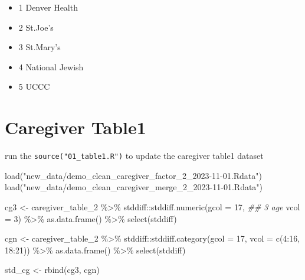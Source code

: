 \documentclass[
  letterpaper,
  DIV=11,
  numbers=noendperiod]{scrreprt}
\newenvironment{Shaded}{\begin{snugshade}}{\end{snugshade}}
\newcommand{\AttributeTok}[1]{\textcolor[rgb]{0.40,0.45,0.13}{#1}}
\newcommand{\DecValTok}[1]{\textcolor[rgb]{0.68,0.00,0.00}{#1}}
\newcommand{\DocumentationTok}[1]{\textcolor[rgb]{0.37,0.37,0.37}{\textit{#1}}}
\newcommand{\FunctionTok}[1]{\textcolor[rgb]{0.28,0.35,0.67}{#1}}
\newcommand{\NormalTok}[1]{\textcolor[rgb]{0.00,0.23,0.31}{#1}}
\newcommand{\OtherTok}[1]{\textcolor[rgb]{0.00,0.23,0.31}{#1}}
\newcommand{\SpecialCharTok}[1]{\textcolor[rgb]{0.37,0.37,0.37}{#1}}
\newcommand{\StringTok}[1]{\textcolor[rgb]{0.13,0.47,0.30}{#1}}
\providecommand{\tightlist}{%
  \setlength{\itemsep}{0pt}\setlength{\parskip}{0pt}}\usepackage{longtable,booktabs,array}
\begin{document}
\begin{itemize}
\tightlist
\item
  1 Denver Health
\item
  2 St.Joe's
\item
  3 St.Mary's
\item
  4 National Jewish
\item
  5 UCCC
\end{itemize}


\hypertarget{caregiver-table1}{%
\chapter{Caregiver Table1}\label{caregiver-table1}}

run the \texttt{source("01\_table1.R")} to update the caregiver table1
dataset

\begin{Shaded}
\begin{Highlighting}[]
\FunctionTok{load}\NormalTok{(}\StringTok{"new\_data/demo\_clean\_caregiver\_factor\_2\_2023{-}11{-}01.Rdata"}\NormalTok{)}
\FunctionTok{load}\NormalTok{(}\StringTok{"new\_data/demo\_clean\_caregiver\_merge\_2\_2023{-}11{-}01.Rdata"}\NormalTok{)}

\NormalTok{cg3 }\OtherTok{\textless{}{-}}\NormalTok{ caregiver\_table\_2 }\SpecialCharTok{\%\textgreater{}\%} 
\NormalTok{  stddiff}\SpecialCharTok{::}\FunctionTok{stddiff.numeric}\NormalTok{(}\AttributeTok{gcol =} \DecValTok{17}\NormalTok{, }
                           \DocumentationTok{\#\# 3 age}
                           \AttributeTok{vcol =} \DecValTok{3}\NormalTok{) }\SpecialCharTok{\%\textgreater{}\%}
  \FunctionTok{as.data.frame}\NormalTok{() }\SpecialCharTok{\%\textgreater{}\%}
  \FunctionTok{select}\NormalTok{(stddiff)}

\NormalTok{cgn }\OtherTok{\textless{}{-}}\NormalTok{ caregiver\_table\_2 }\SpecialCharTok{\%\textgreater{}\%} 
\NormalTok{  stddiff}\SpecialCharTok{::}\FunctionTok{stddiff.category}\NormalTok{(}\AttributeTok{gcol =} \DecValTok{17}\NormalTok{, }
                           \AttributeTok{vcol =} \FunctionTok{c}\NormalTok{(}\DecValTok{4}\SpecialCharTok{:}\DecValTok{16}\NormalTok{, }\DecValTok{18}\SpecialCharTok{:}\DecValTok{21}\NormalTok{)) }\SpecialCharTok{\%\textgreater{}\%}
  \FunctionTok{as.data.frame}\NormalTok{() }\SpecialCharTok{\%\textgreater{}\%}
  \FunctionTok{select}\NormalTok{(stddiff)}

\NormalTok{std\_cg }\OtherTok{\textless{}{-}} \FunctionTok{rbind}\NormalTok{(cg3, cgn)}
\end{Highlighting}
\end{Shaded}
\end{document}

